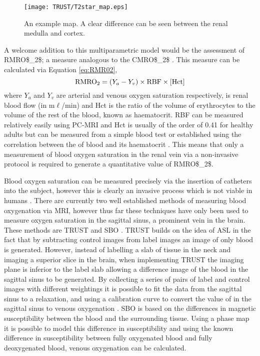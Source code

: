 \begin{figure}[H]
	\centering
	\texttt{[image: TRUST/T2star\_map.eps]}
	\caption{An example \ttwostar map. A clear difference can be seen between the renal medulla and cortex.}
	\label{fig:T2*map}	
\end{figure}

A welcome addition to this multiparametric model would be the assessment of \ac{RMRO$_2$}; a measure analogous to the \ac{CMRO$_2$} \cite{chong_cerebral_2015}. This measure can be calculated via Equation \eqref{eq:RMR02},
\begin{equation}
\textup{RMRO}_{\textup{2}} = \left( Y_a - Y_v \right) \times \textup{RBF} \times \left[\textup{Hct}\right]
\label{eq:RMR02}
\end{equation}
where $Y_a$ and $Y_v$ are arterial and venous oxygen saturation respectively,  is renal blood flow (in m$\ell$/min) and Hct is the ratio of the volume of erythrocytes to the volume of the rest of the blood, known as haematocrit. \ac{RBF} can be measured relatively easily using \ac{PC}-\ac{MRI} \cite{jordan_velocity_1994} and Hct is usually of the order of 0.41 for healthy adults but can be measured from a simple blood test \cite{miao_reference_2002, gardener_dependence_2010} or established using the correlation between the \tone of blood and its haematocrit \cite{shimada_vivo_2012}. This means that only a measurement of blood oxygen saturation in the renal vein via a non-invasive protocol is required to generate a quantitative value of \ac{RMRO$_2$}.

Blood oxygen saturation can be measured precisely via the insertion of catheters into the subject, however this is clearly an invasive process which is not viable in humans \cite{nagdyman_comparison_2005}. There are currently two well established methods of measuring blood oxygenation via \ac{MRI}, however thus far these techniques have only been used to measure oxygen saturation in the sagittal sinus, a prominent vein in the brain. These methods are \ac{TRUST} \cite{lu_quantitative_2008, xu_improving_2012, liu_testretest_2013, liu_multi-site_2016} and \ac{SBO} \cite{jain_mri_2010, jain_cerebral_2014, driver_global_2014, lee_multiplexed_2017}. \ac{TRUST} builds on the idea of \ac{ASL} in the fact that by subtracting control images from label images an image of only blood is generated. However, instead of labelling a slab of tissue in the neck and imaging a superior slice in the brain, when implementing \ac{TRUST} the imaging plane is inferior to the label slab allowing a difference image of the blood in the sagittal sinus to be generated. By collecting a series of pairs of label and control images with different \ttwo weightings it is possible to fit the data from the sagittal sinus to a \ttwo relaxation, and using a calibration curve to convert the value of \ttwo in the sagittal sinus to venous oxygenation \cite{wright_estimating_1991}. \ac{SBO} is based on the differences in magnetic susceptibility between the blood and the surrounding tissue. Using a phase map it is possible to model this difference in susceptibility and using the known difference in susceptibility between fully oxygenated blood and fully deoxygenated blood, venous oxygenation can be calculated.

